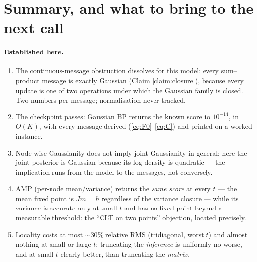 \documentclass[11pt]{article}
\theoremstyle{definition}
\theoremstyle{remark}
\begin{document}
\section{Summary, and what to bring to the next call}\label{sec:summary}

\paragraph{Established here.}
\begin{enumerate}[leftmargin=1.7em, itemsep=2pt]
\item The continuous-message obstruction dissolves for this model: every
sum--product message is exactly Gaussian (Claim \ref{claim:closure}),
because every update is one of two operations under which the Gaussian
family is closed. Two numbers per message; normalisation never tracked.
\item The checkpoint passes: Gaussian BP returns the known score to
$10^{-14}$, in $O(K)$, with every message derived
(\eqref{eq:F0}--\eqref{eq:C}) and printed on a worked instance.
\item Node-wise Gaussianity does not imply joint Gaussianity in general;
here the joint posterior is Gaussian because its log-density is quadratic
--- the implication runs from the model to the messages, not conversely.
\item AMP (per-node mean/variance) returns the \emph{same score} at every
$t$ --- the mean fixed point is $Jm=h$ regardless of the variance closure
--- while its variance is accurate only at small $t$ and has no fixed
point beyond a measurable threshold: the ``CLT on two points'' objection,
located precisely.
\item Locality costs at most $\sim30\%$ relative RMS (tridiagonal, worst
$t$) and almost nothing at small or large $t$; truncating the
\emph{inference} is uniformly no worse, and at small $t$ clearly better,
than truncating the \emph{matrix}.
\end{enumerate}
\end{document}
